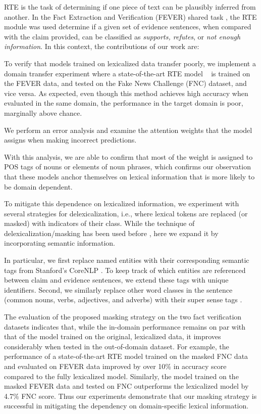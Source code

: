 \documentclass[conference,onecolumn]{IEEEtran}
\begin{document}
RTE is the task of determining if one piece of text can be plausibly inferred from another. In the Fact Extraction and Verification (FEVER) shared task \cite{thorne2018fever}, the RTE module was used determine if a given set of evidence sentences, when compared with the claim provided, can be classified as \textit{supports, refutes}, or \textit{not enough information}.
In this context, the contributions of our work are:

{} To verify that models trained on lexicalized data transfer poorly, we implement a domain transfer experiment where a state-of-the-art RTE model ~\cite{parikh2016decomposable}  is trained on the FEVER data, and tested on the Fake News Challenge (FNC) \citep{pomerleau2017fake} 
dataset, and vice versa. As expected, even though this method achieves high accuracy when evaluated in the same domain, the performance in the target domain is poor, marginally above chance.
 
 
 {} We perform an error analysis and examine the attention weights that the model  assigns when making incorrect predictions.
 
 With this analysis, we are able to confirm that most of the weight is assigned to POS tags of nouns or elements of noun phrases, which confirms our observation that these models anchor themselves on lexical information that is more likely to be domain dependent. 
 
{} To mitigate this dependence on lexicalized information, we experiment with several strategies for delexicalization, i.e., where lexical tokens are replaced (or masked) with indicators of their class. While the technique of delexicalization/masking has been used before \citep[e.g.,]{zeman2008cross}, here we expand it by incorporating semantic information. 



 
In particular, we first replace named entities with their corresponding semantic tags from Stanford's CoreNLP \citep{manning2014stanford}. 
To keep track of which entities are referenced between claim and evidence sentences, we extend these tags with unique identifiers. 
%
Second, we similarly replace other word classes in the sentence (common nouns, verbs, adjectives, and adverbs)  with their super sense tags \citep{ciaramita2003supersense}.



{}  The evaluation of the proposed masking strategy on the two fact verification datasets indicates that,
while the in-domain performance remains on par with that of the model trained on the original, lexicalized data, it improves considerably when tested in the out-of-domain dataset. 
For example, the performance of a state-of-the-art RTE model trained on the masked FNC data and evaluated on FEVER data improved by over 10\% in accuracy score compared to the fully lexicalized model. Similarly, the model trained on the masked FEVER data and tested on FNC outperforms the lexicalized model by 4.7\% FNC score.
Thus our experiments demonstrate that our masking strategy is successful in mitigating the dependency on domain-specific lexical information.
\end{document}
